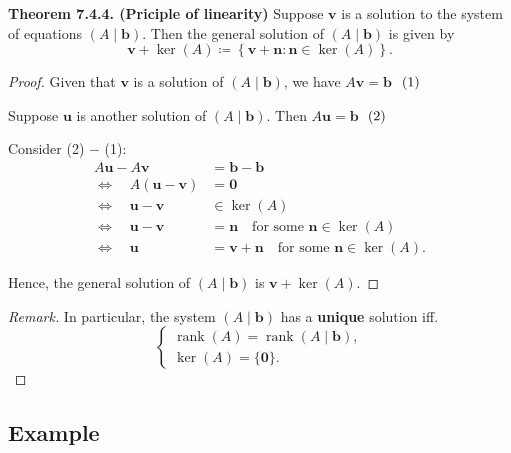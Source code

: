\documentclass[12pt]{article}
\newenvironment{Remark}
{\begin{proof}[Remark]}
{\end{proof}}
\begin{document}
\textbf{Theorem 7.4.4. (Priciple of linearity)}
Suppose $\mathbf{v}$ is a solution to the system of equations
$(A\mid\mathbf{b})$. Then the general solution of $(A\mid\mathbf{b})$
is given by
\[
\mathbf{v}+\ker(A)
\coloneqq
\left\{
\mathbf{v}+\mathbf{n}:\mathbf{n}\in\ker(A)
\right\}.
\]

\begin{proof}
Given that $\mathbf{v}$ is a solution of $(A\mid\mathbf{b})$, we have $A\mathbf{v}=\mathbf{b}$ $\textup{  (1)}$

Suppose $\mathbf{u}$ is another solution of $(A\mid\mathbf{b})$. Then $A\mathbf{u}=\mathbf{b}$ $\textup{  (2)}$

Consider \textup{(2)} $-$ \textup{(1)}:
\begin{align*}
A\mathbf{u}-A\mathbf{v}
    &=\mathbf{b}-\mathbf{b}\\
\Longleftrightarrow\quad
A(\mathbf{u}-\mathbf{v})
    &=\mathbf{0}\\
\Longleftrightarrow\quad
\mathbf{u}-\mathbf{v}
    &\in\ker(A)\\
\Longleftrightarrow\quad
\mathbf{u}-\mathbf{v}
    &=\mathbf{n}
    \quad\text{for some }\mathbf{n}\in\ker(A)\\
\Longleftrightarrow\quad
\mathbf{u}
    &=\mathbf{v}+\mathbf{n}
    \quad\text{for some }\mathbf{n}\in\ker(A).
\end{align*}

Hence, the general solution of $(A\mid\mathbf{b})$ is $\mathbf{v}+\ker(A)$.

\end{proof}
\begin{Remark}
In particular, the system $(A\mid\mathbf{b})$ has a \textbf{unique} solution iff.
\[
\begin{cases}
\operatorname{rank}(A)=\operatorname{rank}(A\mid\mathbf{b}),\\[0.3em]
\ker(A)=\{\mathbf{0}\}.
\end{cases}
\]
\end{Remark}

\subsection{Example}
\end{document}
